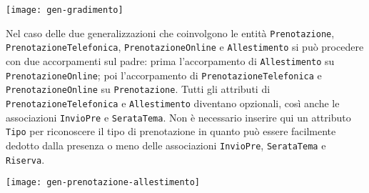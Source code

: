 \vspace{5pt}\centerline{\texttt{[image: gen-gradimento]}}

\vspace{15pt}

Nel caso delle due generalizzazioni che coinvolgono le entità {\tt Prenotazione},
{\tt PrenotazioneTelefonica}, {\tt PrenotazioneOnline} e {\tt Allestimento} si può
procedere con due accorpamenti sul padre: prima l'accorpamento di {\tt Allestimento}
su {\tt PrenotazioneOnline}; poi l'accorpamento di {\tt PrenotazioneTelefonica} e
{\tt PrenotazioneOnline} su {\tt Prenotazione}. Tutti gli attributi di {\tt PrenotazioneTelefonica}
e {\tt Allestimento} diventano opzionali, così anche le associazioni {\tt InvioPre}
e {\tt SerataTema}. Non è necessario inserire qui un attributo {\tt Tipo} per riconoscere
il tipo di prenotazione in quanto può essere facilmente dedotto dalla presenza o meno delle
associazioni {\tt InvioPre}, {\tt SerataTema} e {\tt Riserva}.

\vspace{5pt}\centerline{\texttt{[image: gen-prenotazione-allestimento]}}
